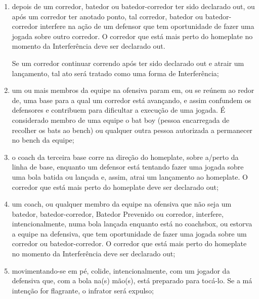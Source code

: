 \begin{enumerate}[label=(\alph*)]
\begin{enumerate}[label=\roman*.]
		Se essa Interferência, na opinião do árbitro, é uma evidente tentativa de evitar um \gls{doubleplay} (jogada dupla), o corredor subsequente imediato deve também ser declarado \gls{out}. O batedor-corredor volta a bater, com um \gls{strike} adicional pela bola \gls{foul}, se a contagem de arremessos anterior à batida era menos de dois \glspl{strike}. Se essa Interferência causar  terceiro \gls{out}, o batedor-corredor voltará a bater como o primeiro batedor no próximo \gls{inning}, com a contagem original de \gls{ball} e \gls{strike} cancelada;

		\item depois de um corredor, batedor ou batedor-corredor ter sido declarado \gls{out}, ou após um corredor ter anotado ponto, tal corredor, batedor ou batedor-corredor interfere na ação de um defensor que tem oportunidade de fazer uma jogada sobre outro corredor. O corredor que está mais perto do \gls{homeplate} no momento da Interferência deve ser declarado \gls{out}.

		Se um corredor continuar correndo após ter sido declarado \gls{out} e atrair um lançamento, tal ato será tratado como uma forma de Interferência;

		\item um ou mais membros da equipe na ofensiva param em, ou se reúnem ao redor de, uma base para a qual um corredor está avançando, e assim confundem os defensores e contribuem para dificultar a execução de uma  jogada. É considerado membro de uma equipe o \gls{bat boy} (pessoa encarregada de recolher os \glspl{bat} ao \gls{bench}) ou qualquer outra pessoa autorizada a permanecer no \gls{bench} da equipe;

		\item o \gls{coach} da terceira base corre na direção do \gls{homeplate}, sobre a/perto da linha de base, enquanto um defensor está tentando fazer uma jogada sobre uma bola batida ou lançada e, assim, atrai um lançamento ao \gls{homeplate}. O corredor que está mais perto do \gls{homeplate} deve ser  declarado \gls{out};

		\item um \gls{coach}, ou qualquer membro da equipe na ofensiva que não seja um batedor, batedor-corredor, Batedor Prevenido ou corredor, interfere,  intencionalmente, numa bola lançada enquanto está no \gls{coachsbox}, ou estorva a equipe na defensiva, que tem oportunidade de fazer uma jogada sobre um corredor ou batedor-corredor. O corredor que está mais perto do \gls{homeplate} no momento da Interferência deve ser declarado \gls{out};
		\item movimentando-se em pé, colide, intencionalmente, com um jogador da defensiva que, com a bola na(s) mão(s), está preparado para tocá-lo. Se  a má intenção for flagrante, o infrator será expulso;


\end{enumerate}
\end{enumerate}
